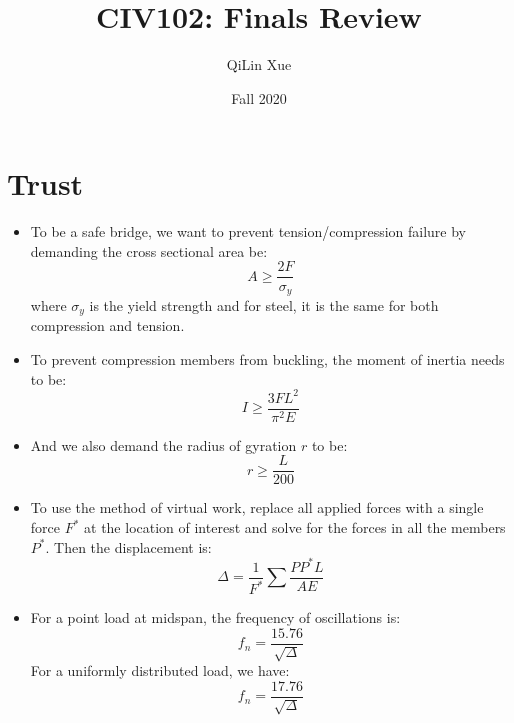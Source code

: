 \documentclass{article}
\title{CIV102: Finals Review}
\author{QiLin Xue}
\date{Fall 2020}
\begin{document}
\maketitle
\section{Trust}
\begin{itemize}
    \item To be a safe bridge, we want to prevent tension/compression failure by demanding the cross sectional area be:
    \begin{equation}
        A \ge \frac{2F}{\sigma_y}
        \label{eq:}
    \end{equation}
    where $\sigma_y$ is the yield strength and for steel, it is the same for both compression and tension.
    \item To prevent compression members from buckling, the moment of inertia needs to be:
    \begin{equation}
        I \ge \frac{3FL^2}{\pi^2 E}
        \label{eq:}
    \end{equation}
    \item And we also demand the radius of gyration $r$ to be:
    \begin{equation}
        r \ge \frac{L}{200}
        \label{eq:}
    \end{equation}
    \item To use the method of virtual work, replace all applied forces with a single force $F^*$ at the location of interest and solve for the forces in all the members $P^*$. Then the displacement is:
    \begin{equation}
        \Delta = \frac{1}{F^*}\sum \frac{PP^* L}{AE}
        \label{eq:}
    \end{equation}
    \item For a point load at midspan, the frequency of oscillations is:
    \begin{equation}
        f_n = \frac{15.76}{\sqrt{\Delta}}
        \label{eq:}
    \end{equation}
    For a uniformly distributed load, we have:
    \begin{equation}
        f_n = \frac{17.76}{\sqrt{\Delta}}
        \label{eq:}
    \end{equation}
\end{itemize}
\end{document}
